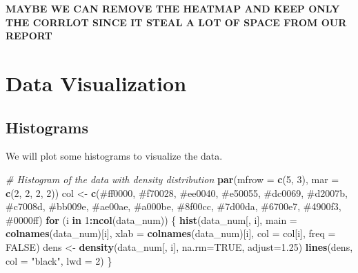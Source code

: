 \documentclass[
]{article}
\newenvironment{Shaded}{\begin{snugshade}}{\end{snugshade}}
\newcommand{\AttributeTok}[1]{\textcolor[rgb]{0.13,0.29,0.53}{#1}}
\newcommand{\CommentTok}[1]{\textcolor[rgb]{0.56,0.35,0.01}{\textit{#1}}}
\newcommand{\ConstantTok}[1]{\textcolor[rgb]{0.56,0.35,0.01}{#1}}
\newcommand{\ControlFlowTok}[1]{\textcolor[rgb]{0.13,0.29,0.53}{\textbf{#1}}}
\newcommand{\DecValTok}[1]{\textcolor[rgb]{0.00,0.00,0.81}{#1}}
\newcommand{\FloatTok}[1]{\textcolor[rgb]{0.00,0.00,0.81}{#1}}
\newcommand{\FunctionTok}[1]{\textcolor[rgb]{0.13,0.29,0.53}{\textbf{#1}}}
\newcommand{\NormalTok}[1]{#1}
\newcommand{\OtherTok}[1]{\textcolor[rgb]{0.56,0.35,0.01}{#1}}
\newcommand{\SpecialCharTok}[1]{\textcolor[rgb]{0.81,0.36,0.00}{\textbf{#1}}}
\newcommand{\StringTok}[1]{\textcolor[rgb]{0.31,0.60,0.02}{#1}}
\begin{document}
\textbf{MAYBE WE CAN REMOVE THE HEATMAP AND KEEP ONLY THE CORRLOT SINCE
IT STEAL A LOT OF SPACE FROM OUR REPORT}

\section{Data Visualization}\label{data-visualization}

\subsection{Histograms}\label{histograms}

We will plot some histograms to visualize the data.

\begin{Shaded}
\begin{Highlighting}[]
\CommentTok{\# Histogram of the data with density distribution}
\FunctionTok{par}\NormalTok{(}\AttributeTok{mfrow =} \FunctionTok{c}\NormalTok{(}\DecValTok{5}\NormalTok{, }\DecValTok{3}\NormalTok{), }\AttributeTok{mar =} \FunctionTok{c}\NormalTok{(}\DecValTok{2}\NormalTok{, }\DecValTok{2}\NormalTok{, }\DecValTok{2}\NormalTok{, }\DecValTok{2}\NormalTok{))}
\NormalTok{col }\OtherTok{\textless{}{-}} \FunctionTok{c}\NormalTok{(}\StringTok{\textquotesingle{}\#ff0000\textquotesingle{}}\NormalTok{, }\StringTok{\textquotesingle{}\#f70028\textquotesingle{}}\NormalTok{, }\StringTok{\textquotesingle{}\#ee0040\textquotesingle{}}\NormalTok{, }\StringTok{\textquotesingle{}\#e50055\textquotesingle{}}\NormalTok{, }\StringTok{\textquotesingle{}\#dc0069\textquotesingle{}}\NormalTok{,}
         \StringTok{\textquotesingle{}\#d2007b\textquotesingle{}}\NormalTok{, }\StringTok{\textquotesingle{}\#c7008d\textquotesingle{}}\NormalTok{, }\StringTok{\textquotesingle{}\#bb009e\textquotesingle{}}\NormalTok{, }\StringTok{\textquotesingle{}\#ae00ae\textquotesingle{}}\NormalTok{, }\StringTok{\textquotesingle{}\#a000be\textquotesingle{}}\NormalTok{,}
         \StringTok{\textquotesingle{}\#8f00cc\textquotesingle{}}\NormalTok{, }\StringTok{\textquotesingle{}\#7d00da\textquotesingle{}}\NormalTok{, }\StringTok{\textquotesingle{}\#6700e7\textquotesingle{}}\NormalTok{, }\StringTok{\textquotesingle{}\#4900f3\textquotesingle{}}\NormalTok{, }\StringTok{\textquotesingle{}\#0000ff\textquotesingle{}}\NormalTok{)}
\ControlFlowTok{for}\NormalTok{ (i }\ControlFlowTok{in} \DecValTok{1}\SpecialCharTok{:}\FunctionTok{ncol}\NormalTok{(data\_num)) \{}
  \FunctionTok{hist}\NormalTok{(data\_num[, i], }\AttributeTok{main =} \FunctionTok{colnames}\NormalTok{(data\_num)[i],}
       \AttributeTok{xlab =} \FunctionTok{colnames}\NormalTok{(data\_num)[i], }\AttributeTok{col =}\NormalTok{ col[i], }\AttributeTok{freq =} \ConstantTok{FALSE}\NormalTok{)}
\NormalTok{  dens }\OtherTok{\textless{}{-}} \FunctionTok{density}\NormalTok{(data\_num[, i], }\AttributeTok{na.rm=}\ConstantTok{TRUE}\NormalTok{, }\AttributeTok{adjust=}\FloatTok{1.25}\NormalTok{)}
  \FunctionTok{lines}\NormalTok{(dens, }\AttributeTok{col =} \StringTok{"black"}\NormalTok{, }\AttributeTok{lwd =} \DecValTok{2}\NormalTok{)}
\NormalTok{\}}
\end{Highlighting}
\end{Shaded}
\end{document}
